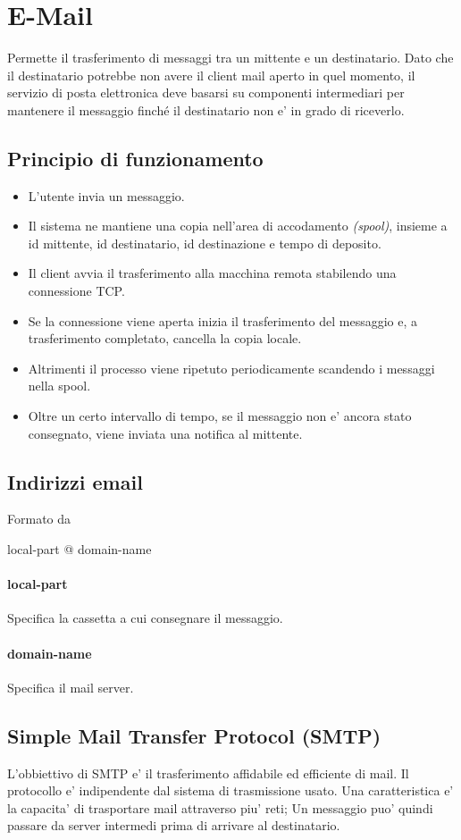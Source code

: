 \section{E-Mail}
Permette il trasferimento di messaggi tra un mittente e un destinatario.
Dato che il destinatario potrebbe non avere il client mail aperto in quel momento, il servizio di posta elettronica deve basarsi su componenti intermediari per mantenere il messaggio finché il destinatario non e' in grado di riceverlo.
\subsection{Principio di funzionamento}
\begin{itemize}
    \item L'utente invia un messaggio.
    \item Il sistema ne mantiene una copia nell'area di accodamento \textit{(spool)}, insieme a id mittente, id destinatario, id destinazione e tempo di deposito.
    \item Il client avvia il trasferimento alla macchina remota  stabilendo una connessione TCP.
    \item Se la connessione viene aperta inizia il trasferimento del messaggio e, a trasferimento completato, cancella la copia locale.
    \item Altrimenti il processo viene ripetuto periodicamente scandendo i messaggi nella spool.
    \item Oltre un certo intervallo di tempo, se il messaggio non e' ancora stato consegnato, viene inviata una notifica al mittente.
\end{itemize}
\subsection{Indirizzi email}
Formato da
\begin{center}
    local-part @ domain-name
\end{center}
\paragraph{local-part} Specifica la cassetta a cui consegnare il messaggio.
\paragraph{domain-name} Specifica il mail server.

\subsection{Simple Mail Transfer Protocol (SMTP)}
L'obbiettivo di SMTP e' il trasferimento affidabile ed efficiente di mail.
Il protocollo e' indipendente dal sistema di trasmissione usato.
Una caratteristica e' la capacita' di trasportare mail attraverso piu' reti; Un messaggio puo' quindi passare da server intermedi prima di arrivare al destinatario.

